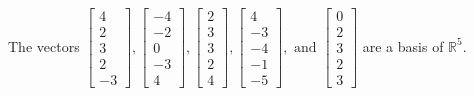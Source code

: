 \begin{exercise}
\begin{exerciseStatement}
  \end{exerciseStatement}
  \begin{exerciseAnswer}
   The vectors \(\left[\begin{array}{r}
4 \\
2 \\
3 \\
2 \\
-3
\end{array}\right] , \left[\begin{array}{r}
-4 \\
-2 \\
0 \\
-3 \\
4
\end{array}\right] , \left[\begin{array}{r}
2 \\
3 \\
3 \\
2 \\
4
\end{array}\right] , \left[\begin{array}{r}
4 \\
-3 \\
-4 \\
-1 \\
-5
\end{array}\right] , \text{ and } \left[\begin{array}{r}
0 \\
2 \\
3 \\
2 \\
3
\end{array}\right]\) 
  	 are  a basis of \(\mathbb{R}^5\).
  


  \end{exerciseAnswer}
\end{exercise}